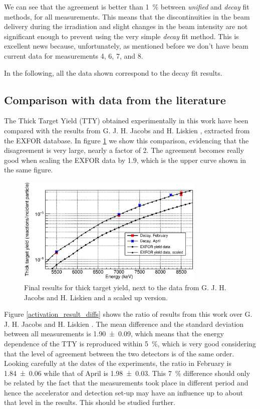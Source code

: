 \documentclass[a4paper,12pt]{report}
\begin{document}
We can see that the agreement is better than \qty{1}{\percent} between \textit{unified} and \textit{decay} fit methods, for all measurements.
This means that the discontinuities in the beam delivery during the irradiation and slight changes in the beam intensity are not significant enough to prevent using the very simple \textit{decay} fit method.
This is excellent news because, unfortunately, as mentioned before we don't have beam current data for measurements 4, 6, 7, and 8.

In the following, all the data shown correspond to the decay fit results.
\\

\subsection{Comparison with data from the literature}
The Thick Target Yield (TTY) obtained experimentally in this work have been compared with the results from G. J. H. Jacobs and H. Liskien \cite{jacobs}, extracted from the EXFOR database.
In figure \ref{activation_final_results} we show this comparison, evidencing that the disagreement is very large, nearly a factor of \num{2}.
The agreement becomes really good when scaling the EXFOR data by 1.9, which is the upper curve shown in the same figure.

\begin{figure}[H]
	\centering
	\includegraphics[width=0.80\textwidth]{activation_final_results.eps}	%
	\caption{Final results for thick target yield, next to the data from G. J. H. Jacobs and H. Liskien \cite{jacobs} and a scaled up version.}	%
	\label{activation_final_results}
\end{figure}

Figure \ref{activation_result_diffs} shows the ratio of results from this work over G. J. H. Jacobs and H. Liskien \cite{jacobs}.
The mean difference and the standard deviation between all measurements is \num{1.90(9)}, which means that the energy dependence of the TTY is reproduced within \qty{5}{\percent}, which is very good considering that the level of agreement between the two detectors is of the same order.
Looking carefully at the dates of the experiments, the ratio in February is \num{1.84(6)} while that of April is \num{1.98(3)}.
This \qty{7}{\percent} difference should only be related by the fact that the measurements took place in different period and hence the accelerator and detection set-up may have an influence up to about that level in the results.
This should be studied further.
\end{document}

